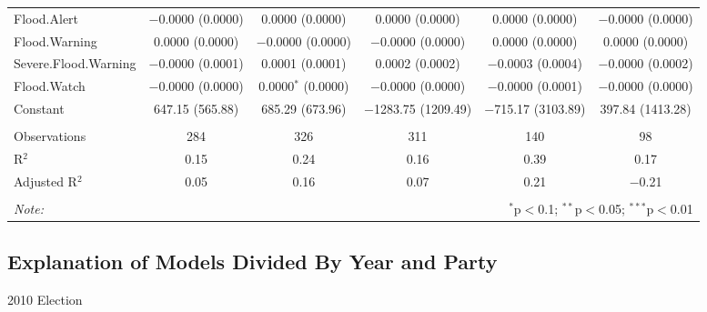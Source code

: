 \documentclass[12pt,letterpaper]{article}
\begin{document}
\begin{table}[!htbp]
\begin{adjustbox}{width=\textwidth}
\begin{tabular}{@{\extracolsep{5pt}}lccccc}
			Flood.Alert & $-$0.0000 (0.0000) & 0.0000 (0.0000) & 0.0000 (0.0000) & 0.0000 (0.0000) & $-$0.0000 (0.0000) \\ 
			Flood.Warning & 0.0000 (0.0000) & $-$0.0000 (0.0000) & $-$0.0000 (0.0000) & 0.0000 (0.0000) & 0.0000 (0.0000) \\ 
			Severe.Flood.Warning & $-$0.0000 (0.0001) & 0.0001 (0.0001) & 0.0002 (0.0002) & $-$0.0003 (0.0004) & $-$0.0000 (0.0002) \\ 
			Flood.Watch & $-$0.0000 (0.0000) & 0.0000$^{*}$ (0.0000) & $-$0.0000 (0.0000) & $-$0.0000 (0.0001) & $-$0.0000 (0.0000) \\ 
			Constant & 647.15 (565.88) & 685.29 (673.96) & $-$1283.75 (1209.49) & $-$715.17 (3103.89) & 397.84 (1413.28) \\ 
			\hline \\[-1.8ex] 
			Observations & 284 & 326 & 311 & 140 & 98 \\ 
			R$^{2}$ & 0.15 & 0.24 & 0.16 & 0.39 & 0.17 \\ 
			Adjusted R$^{2}$ & 0.05 & 0.16 & 0.07 & 0.21 & $-$0.21 \\ 
			\hline 
			\hline \\[-1.8ex] 
			\textit{Note:}  & \multicolumn{5}{r}{$^{*}$p$<$0.1; $^{**}$p$<$0.05; $^{***}$p$<$0.01} \\ 
		\end{tabular} 
	\end{adjustbox}
\end{table}


\subsection{Explanation of Models Divided By Year and Party}


2010 Election
\end{document}
